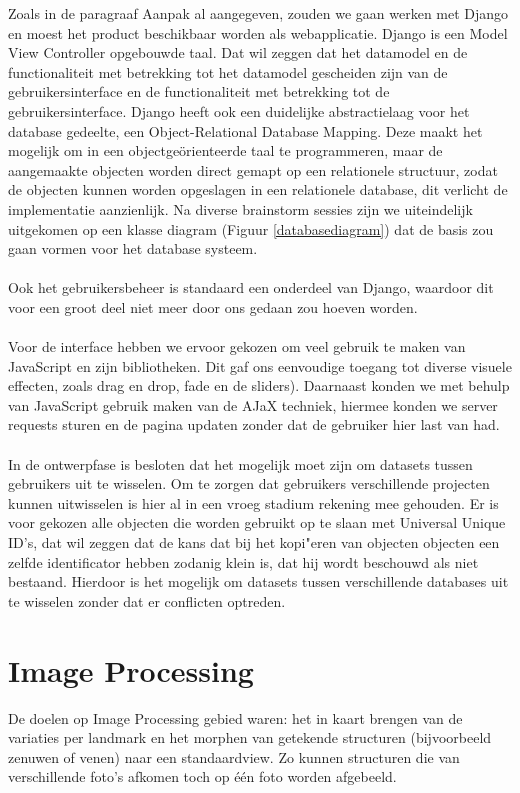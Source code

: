 Zoals in de paragraaf Aanpak al aangegeven, zouden we gaan werken met Django en moest het product beschikbaar worden als webapplicatie. Django is een Model View Controller opgebouwde taal. Dat wil zeggen dat het datamodel en de functionaliteit met betrekking tot het datamodel gescheiden zijn van de gebruikersinterface en de functionaliteit met betrekking tot de gebruikersinterface. Django heeft ook een duidelijke abstractielaag voor het database gedeelte, een Object-Relational Database Mapping. Deze maakt het mogelijk om in een object\-ge\"{o}rienteerde taal te programmeren, maar de aangemaakte objecten worden direct gemapt op een relationele structuur, zodat de objecten kunnen worden opgeslagen in een relationele database, dit verlicht de implementatie aanzienlijk. Na diverse brainstorm sessies zijn we uiteindelijk uitgekomen op een klasse diagram (Figuur \ref{databasediagram}) dat de basis zou gaan vormen voor het database systeem.
\\
\\
Ook het gebruikers\-beheer is standaard een onderdeel van Django, waardoor dit voor een groot deel niet meer door ons gedaan zou hoeven worden.
\\
\\
Voor de interface hebben we ervoor gekozen om veel gebruik te maken van JavaScript en zijn bibliotheken. Dit gaf ons eenvoudige toegang tot diverse visuele effecten, zoals drag en drop, fade en de sliders). Daarnaast konden we met behulp van JavaScript gebruik maken van de AJaX techniek, hiermee konden we server requests sturen en de pagina updaten zonder dat de gebruiker hier last van had.
\\
\\
In de ontwerpfase is besloten dat het mogelijk moet zijn om datasets tussen gebruikers uit te wisselen. Om te zorgen dat gebruikers verschillende projecten kunnen uitwisselen is hier al in een vroeg stadium rekening mee gehouden. Er is voor gekozen alle objecten die worden gebruikt op te slaan met Universal Unique ID's, dat wil zeggen dat de kans dat bij het kopi"{e}ren van objecten objecten een zelfde identificator hebben zodanig klein is, dat hij wordt beschouwd als niet bestaand. Hierdoor is het mogelijk om datasets tussen verschillende databases uit te wisselen zonder dat er conflicten optreden.

\section{Image Processing}
\label{aanpak_image_processing}
De doelen op Image Processing gebied waren: het in kaart brengen van de variaties per landmark en het morphen van getekende structuren (bijvoorbeeld zenuwen of venen) naar een standaardview. Zo kunnen structuren die van verschillende foto's afkomen toch op \'{e}\'{e}n foto worden afgebeeld.

